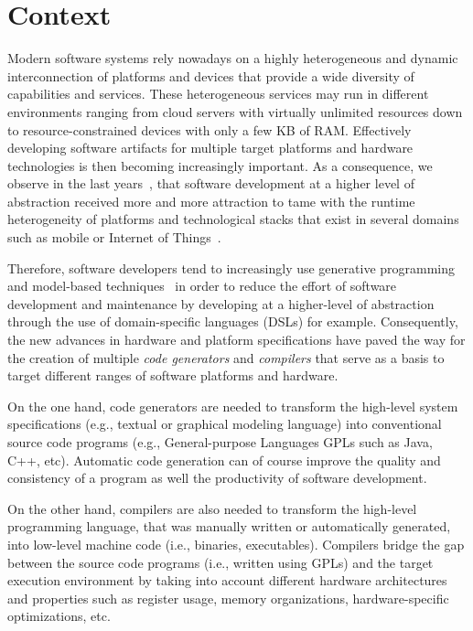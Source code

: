 

\section{Context}
Modern software systems rely nowadays on a highly heterogeneous and dynamic interconnection of platforms and devices that provide a wide diversity of capabilities and services. These heterogeneous services may run in different environments ranging from cloud servers with virtually unlimited resources down to resource-constrained devices with only a few KB of RAM. Effectively developing software artifacts for multiple target platforms and hardware technologies is then becoming increasingly important. As a consequence, we observe in the last years~\cite{Czarnecki:2000:GPM:345203}, that software development at a higher level of abstraction received more and more attraction to tame with the runtime heterogeneity of platforms and technological stacks that exist in several domains such as mobile or Internet of Things~\cite{betz2011improving}.

Therefore, software developers tend to increasingly use generative programming~\cite{Czarnecki:2000:GPM:345203} and model-based techniques~\cite{france2007model} in order to reduce the effort of software development and maintenance by developing at a higher-level of abstraction through the use of domain-specific languages (DSLs) for example. 
Consequently, the new advances in hardware and platform specifications have paved the way for the creation of multiple \textit{code generators} and \textit{compilers} that serve as a basis to target different ranges of software platforms and hardware. 

On the one hand, code generators are needed to transform the high-level system specifications (e.g., textual or graphical modeling language) into conventional source code programs (e.g., General-purpose Languages GPLs such as Java, C++, etc). Automatic code generation can of course improve the quality and consistency of a program as well the productivity of software development\cite{kapteijns2009comparative}.

On the other hand, compilers are also needed to transform the high-level programming language, that was manually written or automatically generated, into low-level machine code (i.e., binaries, executables). 
Compilers bridge the gap between the source code programs (i.e., written using GPLs) and the target execution environment by taking into account different hardware architectures and properties such as register usage, memory organizations, hardware-specific optimizations, etc. 

